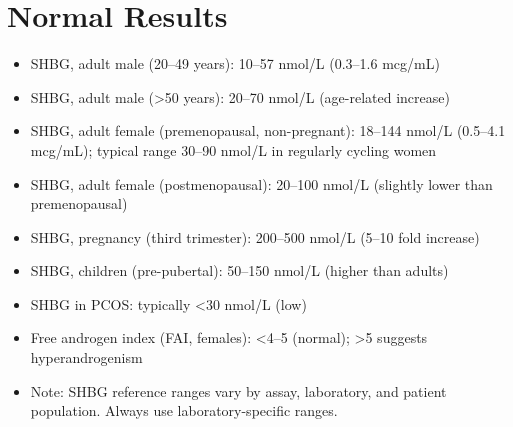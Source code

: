 \section*{Normal Results}
\begin{itemize}
  \item SHBG, adult male (20--49 years): 10--57 nmol/L (0.3--1.6 mcg/mL)
  \item SHBG, adult male (>50 years): 20--70 nmol/L (age-related increase)
  \item SHBG, adult female (premenopausal, non-pregnant): 18--144 nmol/L (0.5--4.1 mcg/mL); typical range 30--90 nmol/L in regularly cycling women
  \item SHBG, adult female (postmenopausal): 20--100 nmol/L (slightly lower than premenopausal)
  \item SHBG, pregnancy (third trimester): 200--500 nmol/L (5--10 fold increase)
  \item SHBG, children (pre-pubertal): 50--150 nmol/L (higher than adults)
  \item SHBG in PCOS: typically <30 nmol/L (low)
  \item Free androgen index (FAI, females): <4--5 (normal); >5 suggests hyperandrogenism
  \item Note: SHBG reference ranges vary by assay, laboratory, and patient population. Always use laboratory-specific ranges.
\end{itemize}

